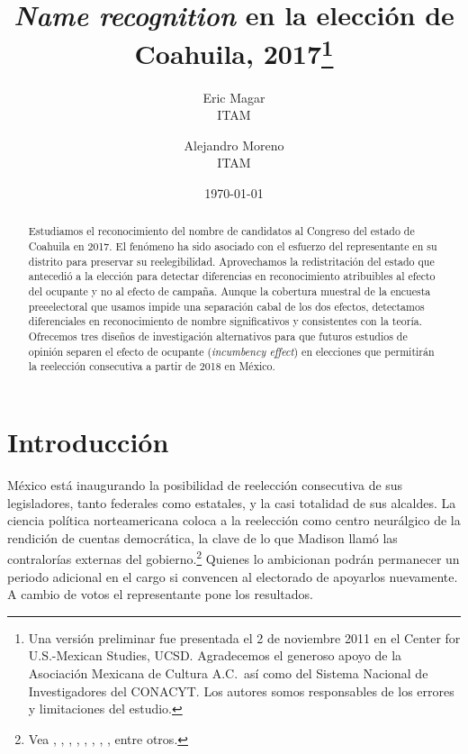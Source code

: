 \documentclass[letter,12pt]{article}
\begin{document}
\title{\emph{Name recognition} en la elección de Coahuila, 2017\thanks{Una versión preliminar fue presentada el 2 de noviembre 2011 en el Center for U.S.-Mexican Studies, UCSD. Agradecemos el generoso apoyo de la Asociación Mexicana de Cultura A.C.\ así como del Sistema Nacional de Investigadores del CONACYT. Los autores somos responsables de los errores y limitaciones del estudio.}}
\author{Eric Magar  \\ ITAM \and
        Alejandro Moreno \\ ITAM 
}
\date{\today}
\maketitle


\begin{abstract}
\noindent Estudiamos el reconocimiento del nombre de candidatos al Congreso del estado de Coahuila en 2017. El fenómeno ha sido asociado con el esfuerzo del representante en su distrito para preservar su reelegibilidad. Aprovechamos la redistritación del estado que antecedió a la elección para detectar diferencias en reconocimiento atribuibles al efecto del ocupante y no al efecto de campaña. Aunque la cobertura muestral de la encuesta preeelectoral que usamos impide una separación cabal de los dos efectos, detectamos diferenciales en reconocimiento de nombre significativos y consistentes con la teoría. Ofrecemos tres diseños de investigación alternativos para que futuros estudios de opinión separen el efecto de ocupante (\emph{incumbency effect}) en elecciones que permitirán la reelección consecutiva a partir de 2018 en México. 
\end{abstract}


\onehalfspacing

\section{Introducción}

\noindent México está inaugurando la posibilidad de reelección consecutiva de sus legisladores, tanto federales como estatales, y la casi totalidad de sus alcaldes. La ciencia política norteamericana coloca a la reelección como centro neurálgico de la rendición de cuentas democrática, la clave de lo que Madison \citeyearpar{madison.51.esp} llamó las contralorías externas del gobierno.\footnote{Vea \citet{schlesinger.1966}, \citet{mayhew.1974}, \citet{fenno.1978}, \citet{cain.etal.1987}, \citet{mccubbins.sullivan.1987}, \citet{cox.mccubbins.1993}, \citet{weingast.marshall.1988}, \citet{jacobson.1997}, entre otros.} Quienes lo ambicionan podrán permanecer un periodo adicional en el cargo si convencen al electorado de apoyarlos nuevamente. A cambio de votos el representante pone los resultados. 
\end{document}
